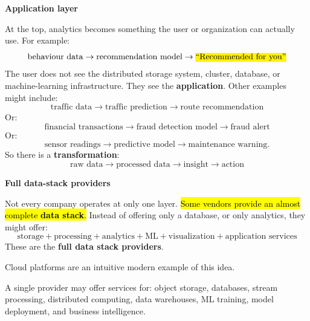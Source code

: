 \highspace
\begin{flushleft}
    \textcolor{Green3}{ \textbf{Application layer}}
\end{flushleft}
At the top, analytics becomes something the user or organization can actually use. For example:
\begin{equation*}
    \text{behaviour data}
    \rightarrow
    \text{recommendation model}
    \rightarrow
    \text{\hl{``Recommended for you''}}
\end{equation*}
The user does not see the distributed storage system, cluster, database, or machine-learning infrastructure. They see the \textbf{application}. Other examples might include:
\begin{equation*}
    \text{traffic data}
    \rightarrow
    \text{traffic prediction}
    \rightarrow
    \text{route recommendation}
\end{equation*}
Or:
\begin{equation*}
    \text{financial transactions}
    \rightarrow
    \text{fraud detection model}
    \rightarrow
    \text{fraud alert}
\end{equation*}
Or:
\begin{equation*}
    \text{sensor readings}
    \rightarrow
    \text{predictive model}
    \rightarrow
    \text{maintenance warning}.
\end{equation*}
So there is a \textbf{transformation}:
\begin{equation*}
    \text{raw data}
    \rightarrow
    \text{processed data}
    \rightarrow
    \text{insight}
    \rightarrow
    \text{action}
\end{equation*}

\highspace
\begin{flushleft}
    \textcolor{Green3}{ \textbf{Full data-stack providers}}
\end{flushleft}
Not every company operates at only one layer. \hl{Some vendors provide an almost complete \textbf{data stack}.} Instead of offering only a database, or only analytics, they might offer:
\begin{equation*}
    \text{storage}
    +
    \text{processing}
    +
    \text{analytics}
    +
    \text{ML}
    +
    \text{visualization}
    +
    \text{application services}
\end{equation*}
These are the \textbf{full data stack providers}.

\begin{examplebox}
    Cloud platforms are an intuitive modern example of this idea.

    A single provider may offer services for: object storage, databases, stream processing, distributed computing, data warehouses, ML training, model deployment, and business intelligence.
\end{examplebox}

